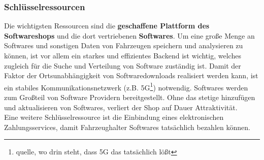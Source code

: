 \subsubsection{Schlüsselressourcen}
Die wichtigsten Ressourcen sind die \textbf{geschaffene Plattform des Softwareshops} und die dort vertriebenen \textbf{Softwares}. Um eine große Menge an Softwares und sonstigen Daten von Fahrzeugen speichern und analysieren zu können, ist vor allem ein starkes und effizientes Backend ist wichtig, welches zugleich für die Suche und Verteilung von Software zuständig ist. Damit der Faktor der Ortsunabhängigkeit von Softwaredownloads realisiert werden kann, ist ein stabiles Kommunikationsnetzwerk (z.B. 5G\footnote{quelle, wo drin steht, dass 5G das tatsächlich lößt}) notwendig. Softwares werden zum Großteil von Software Providern bereitgestellt. Ohne das stetige hinzufügen und aktualisieren von Softwares, verliert der Shop auf Dauer Attraktivität.\\
Eine weitere Schlüsselressource ist die Einbindung eines elektronischen Zahlungsservices, damit Fahrzeughalter Softwares tatsächlich bezahlen können.\\

